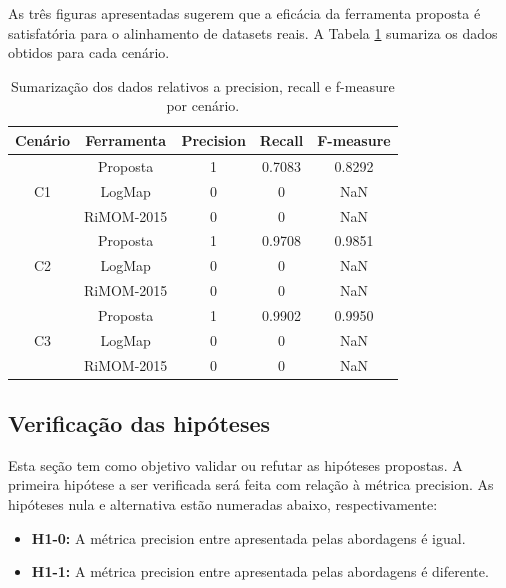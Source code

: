As três figuras apresentadas sugerem que a eficácia da ferramenta proposta é satisfatória para o alinhamento de datasets reais. A Tabela \ref{tab:resultados} sumariza os dados obtidos para cada cenário.

\begin{table}[h]
\centering
\caption{Sumarização dos dados relativos a precision, recall e f-measure por cenário.}
\label{tab:resultados}
\begin{tabular}{|c|c|c|c|c|}
\hline
Cenário             & Ferramenta & Precision & Recall & F-measure \\ \hline
\multirow{3}{*}{C1} & Proposta   & 1         & 0.7083 & 0.8292    \\ \cline{2-5} 
                    & LogMap     & 0         & 0      & NaN       \\ \cline{2-5} 
                    & RiMOM-2015 & 0         & 0      & NaN       \\ \hline
\multirow{3}{*}{C2} & Proposta   & 1         & 0.9708 & 0.9851    \\ \cline{2-5} 
                    & LogMap     & 0         & 0      & NaN       \\ \cline{2-5} 
                    & RiMOM-2015 & 0         & 0      & NaN       \\ \hline
\multirow{3}{*}{C3} & Proposta   & 1         & 0.9902 & 0.9950    \\ \cline{2-5} 
                    & LogMap     & 0         & 0      & NaN       \\ \cline{2-5} 
                    & RiMOM-2015 & 0         & 0      & NaN       \\ \hline
\end{tabular}
\end{table}

\subsection*{Verificação das hipóteses}
Esta seção tem como objetivo validar ou refutar as hipóteses propostas. A primeira hipótese a ser verificada será feita com relação à métrica precision. As hipóteses nula e alternativa estão numeradas abaixo, respectivamente:

\begin{itemize}
\item \textbf{H1-0:} A métrica precision entre apresentada pelas abordagens é igual.
\item \textbf{H1-1:} A métrica precision entre apresentada pelas abordagens é diferente.
\end{itemize}

